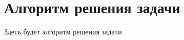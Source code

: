 \renewcommand{\chaptertitle}{Алгоритм решения задачи}  %
\chapter{\chaptertitle}\label{ch:ch7}


Здесь будет алгоритм решения задачи
